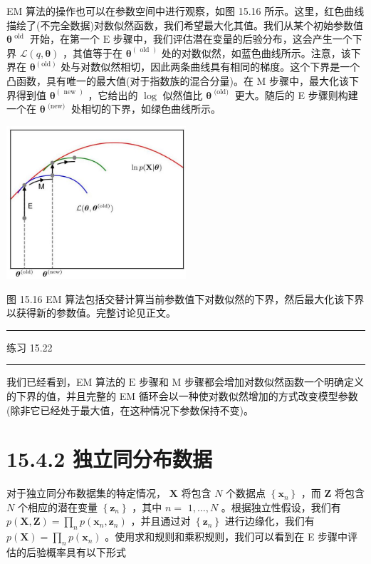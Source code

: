 \documentclass[10pt]{report}
\newcommand{\HRule}{\begin{center}\rule{0.9\linewidth}{0.2mm}\end{center}}
\begin{document}
EM 算法的操作也可以在参数空间中进行观察，如图 15.16 所示。这里，红色曲线描绘了(不完全数据)对数似然函数，我们希望最大化其值。我们从某个初始参数值 \({\mathbf{\theta }}^{\text{ old }}\) 开始，在第一个 \(\mathrm{E}\) 步骤中，我们评估潜在变量的后验分布，这会产生一个下界 \(\mathcal{L}\left( {q,\mathbf{\theta }}\right)\) ，其值等于在 \({\mathbf{\theta }}^{\left( \text{ old }\right) }\) 处的对数似然，如蓝色曲线所示。注意，该下界在 \({\mathbf{\theta }}^{\left( \mathrm{{old}}\right) }\) 处与对数似然相切，因此两条曲线具有相同的梯度。这个下界是一个凸函数，具有唯一的最大值(对于指数族的混合分量)。在 M 步骤中，最大化该下界得到值 \({\mathbf{\theta }}^{\left( \text{ new }\right) }\) ，它给出的 \(\log\) 似然值比 \({\mathbf{\theta }}^{\text{ (old) }}\) 更大。随后的 E 步骤则构建一个在 \({\mathbf{\theta }}^{\text{ (new) }}\) 处相切的下界，如绿色曲线所示。

\begin{center}
\includegraphics[max width=0.5\textwidth]{images/0194e279-9b28-703a-88f4-c3ac21e2010d_507_885_345_668_568_0.jpg}
\end{center}
\hspace*{3em} 

图 15.16 EM 算法包括交替计算当前参数值下对数似然的下界，然后最大化该下界以获得新的参数值。完整讨论见正文。

\HRule

练习 15.22

\HRule

我们已经看到，EM 算法的 \(\mathrm{E}\) 步骤和 \(\mathrm{M}\) 步骤都会增加对数似然函数一个明确定义的下界的值，并且完整的 EM 循环会以一种使对数似然增加的方式改变模型参数(除非它已经处于最大值，在这种情况下参数保持不变)。

\section*{15.4.2 独立同分布数据}

对于独立同分布数据集的特定情况， \(\mathbf{X}\) 将包含 \(N\) 个数据点 \(\left\{  {\mathbf{x}}_{n}\right\}\) ，而 \(\mathbf{Z}\) 将包含 \(N\) 个相应的潜在变量 \(\left\{  {\mathbf{z}}_{n}\right\}\) ，其中 \(n =\)  \(1,\ldots ,N\) 。根据独立性假设，我们有 \(p\left( {\mathbf{X},\mathbf{Z}}\right)  = \mathop{\prod }\limits_{n}p\left( {{\mathbf{x}}_{n},{\mathbf{z}}_{n}}\right)\) ，并且通过对 \(\left\{  {\mathbf{z}}_{n}\right\}\) 进行边缘化，我们有 \(p\left( \mathbf{X}\right)  = \mathop{\prod }\limits_{n}p\left( {\mathbf{x}}_{n}\right)\) 。使用求和规则和乘积规则，我们可以看到在 E 步骤中评估的后验概率具有以下形式
\end{document}
